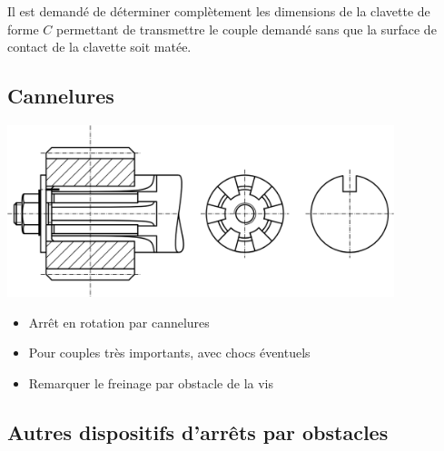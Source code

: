 \documentclass[11pt,oneside]{article}
\begin{document}
Il est demandé de déterminer complètement les dimensions de la clavette de
forme $C$ permettant de transmettre le couple demandé sans que la surface de
contact de la clavette soit matée. 













\subsection{Cannelures}
 \begin{center}
  \includegraphics[height=5cm]{png/Fig8}

 \end{center}

\begin{itemize}
\item Arrêt en rotation par cannelures
\item Pour couples très importants, avec chocs éventuels
\item Remarquer le freinage par obstacle de la vis
\end{itemize}

\subsection{Autres dispositifs d'arrêts par obstacles}
\end{document}
